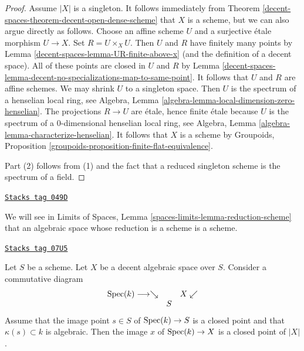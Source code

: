 \begin{proof}
Assume $|X|$ is a singleton. It follows immediately from
Theorem \ref{decent-spaces-theorem-decent-open-dense-scheme} that $X$ is a scheme,
but we can also argue directly as follows.
Choose an affine scheme $U$ and a surjective \'etale morphism $U \to X$.
Set $R = U \times_X U$. Then $U$ and $R$ have finitely many points by
Lemma \ref{decent-spaces-lemma-UR-finite-above-x} (and the definition of a decent space).
All of these points are closed in $U$ and $R$ by
Lemma \ref{decent-spaces-lemma-decent-no-specializations-map-to-same-point}.
It follows that $U$ and $R$ are affine schemes.
We may shrink $U$ to a singleton space. Then $U$ is
the spectrum of a henselian local ring, see
Algebra, Lemma \ref{algebra-lemma-local-dimension-zero-henselian}.
The projections $R \to U$ are \'etale, hence finite \'etale because
$U$ is the spectrum of a $0$-dimensional henselian local ring, see
Algebra, Lemma \ref{algebra-lemma-characterize-henselian}.
It follows that $X$ is a scheme by
Groupoids, Proposition \ref{groupoids-proposition-finite-flat-equivalence}.

\medskip\noindent
Part (2) follows from (1) and the fact that a reduced singleton
scheme is the spectrum of a field.
\end{proof}

\begin{remark}
\label{decent-spaces-remark-one-point-decent-scheme}
\href{https://stacks.math.columbia.edu/tag/049D}{\texttt{Stacks tag 049D}}

We will see in
Limits of Spaces, Lemma \ref{spaces-limits-lemma-reduction-scheme}
that an algebraic space
whose reduction is a scheme is a scheme.
\end{remark}

\begin{lemma}
\label{decent-spaces-lemma-algebraic-residue-field-extension-closed-point}
\href{https://stacks.math.columbia.edu/tag/07U5}{\texttt{Stacks tag 07U5}}

Let $S$ be a scheme. Let $X$ be a decent algebraic space over $S$.
Consider a commutative diagram
$$
\begin{array}{ccc}\operatorname{Spec}(k) \longrightarrow\searrow &  & X \swarrow \\  & S & \end{array}
$$
Assume that the image point $s \in S$ of $\operatorname{Spec}(k) \to S$ is
a closed point and that $\kappa(s) \subset k$ is algebraic.
Then the image $x$ of $\operatorname{Spec}(k) \to X$ is a closed point of $|X|$.
\end{lemma}

